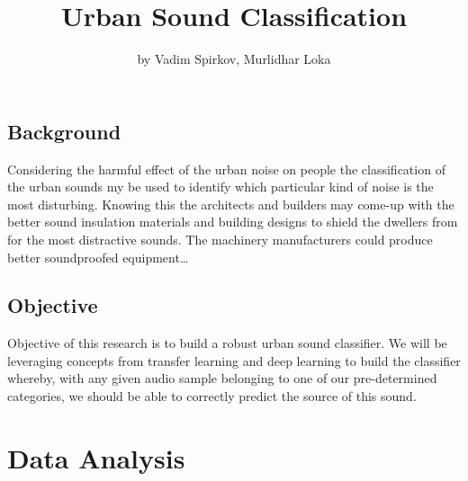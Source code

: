 \title{Urban Sound Classification}
\author{by Vadim Spirkov, Murlidhar Loka}

\maketitle



\hypertarget{background}{%
\subsection{Background}\label{background}}

Considering the harmful effect of the urban noise on people the
classification of the urban sounds my be used to identify which
particular kind of noise is the most disturbing. Knowing this the
architects and builders may come-up with the better sound insulation
materials and building designs to shield the dwellers from for the most
distractive sounds. The machinery manufacturers could produce better
soundproofed equipment\ldots{}

\hypertarget{objective}{%
\subsection{Objective}\label{objective}}

Objective of this research is to build a robust urban sound classifier.
We will be leveraging concepts from transfer learning and deep learning
to build the classifier whereby, with any given audio sample belonging
to one of our pre-determined categories, we should be able to correctly
predict the source of this sound.

\hypertarget{data-analysis}{%
\section{Data Analysis}\label{data-analysis}}

